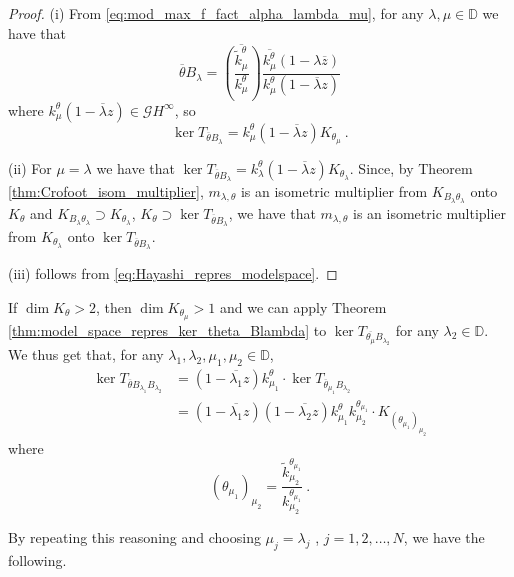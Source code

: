 \documentclass{article}
\numberwithin{equation}{section}
\theoremstyle{plain}
\newcommand{\Hinf}{\ensuremath{H^\infty}}
\newcommand{\DD}{\ensuremath{\mathbb{D}}}
\newcommand{\GG}{\ensuremath{\mathcal{G}}}
\newcommand{\ol}[1]{\ensuremath{\overline{#1}}}
\begin{document}
\begin{proof}
(i) From \eqref{eq:mod_max_f_fact_alpha_lambda_mu}, for any $\lambda,\mu\in\DD$ we have that
\begin{equation}
\ol\theta B_\lambda = \ol{\left( \frac{\tilde k_\mu^\theta}{k_\mu^\theta}    \right)} \frac{\ol{k_\mu^\theta} (1-\lambda\ol z)}{k_\mu^\theta (1 -\ol\lambda z)}
\end{equation}
where $k_\mu^\theta (1 -\ol\lambda z) \in \GG\Hinf$, so
\begin{equation}
\ker T_{\ol\theta B_\lambda} = k_\mu^\theta (1 -\ol\lambda z) K_{\theta_\mu}\ .
\end{equation}


(ii) For $\mu = \lambda$ we have that $\ker T_{\ol\theta B_\lambda} = k_\lambda^\theta (1 -\ol\lambda z) K_{\theta_\lambda}$.
Since, by Theorem \ref{thm:Crofoot_isom_multiplier}, $m_{\lambda,\theta}$ is an isometric multiplier from $K_{B_\lambda \theta_\lambda}$ onto $K_\theta$ and $K_{B_\lambda \theta_\lambda} \supset K_{\theta_\lambda}$, $K_\theta \supset \ker T_{\ol\theta B_\lambda}$, we have that $m_{\lambda,\theta}$ is an isometric multiplier from $K_{\theta_\lambda}$ onto $\ker T_{\ol\theta B_\lambda}$.


(iii) follows from \eqref{eq:Hayashi_repres_modelspace}.
\end{proof}


If $\dim K_\theta >2$, then $\dim K_{\theta_\mu}>1$ and we can apply Theorem \ref{thm:model_space_repres_ker_theta_Blambda} to $\ker T_{\ol{\theta_\mu} B_{\lambda_2}}$ for any $\lambda_2\in\DD$.
We thus get that, for any $\lambda_1,\lambda_2,\mu_1,\mu_2\in\DD$,
\begin{align}
\ker T_{\ol\theta B_{\lambda_1} B_{\lambda_2}} & = 
(1-\ol{\lambda_1} z) k_{\mu_1}^\theta \cdot \ker T_{\ol\theta_{\mu_1} B_{\lambda_2}} \nonumber\\
	& = (1-\ol{\lambda_1} z) (1-\ol{\lambda_2} z) k_{\mu_1}^\theta k_{\mu_2}^{\theta_{\mu_1}} \cdot K_{(\theta_{\mu_1})_{\mu_2}}
\end{align}
where
\begin{equation}
(\theta_{\mu_1})_{\mu_2} = \frac{\tilde k_{\mu_2}^{\theta_{\mu_1}}}{k_{\mu_2}^{\theta_{\mu_1}}}\ .
\end{equation}


By repeating this reasoning and choosing $\mu_j = \lambda_j$ , $j=1,2,\dots,N$, we have the following.
\end{document}
